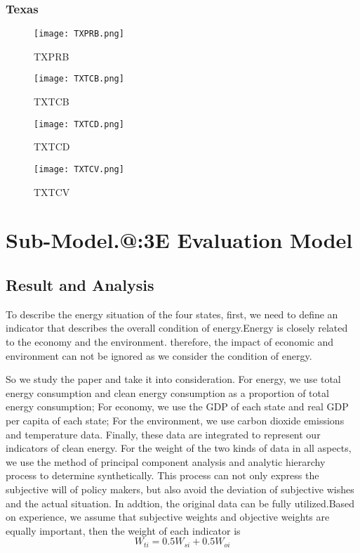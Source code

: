 \documentclass{mcmthesis}
\makeatletter
\newcommand{\Rmnum}[1]{\expandafter\@slowromancap\romannumeral #1@}
\makeatother
\begin{document}
\subsubsection{Texas}
\begin{figure}[H]
\begin{minipage}[htb]{0.5\textwidth}
\centering
\texttt{[image: TXPRB.png]}
\caption{TXPRB} \label{fig:TXPRB}
\end{minipage}
\begin{minipage}[htb]{0.5\textwidth}
\centering
\texttt{[image: TXTCB.png]}
\caption{TXTCB} \label{fig:TXTCB}
\end{minipage}
\end{figure}

\begin{figure}[H]
\begin{minipage}[htb]{0.5\textwidth}
\centering
\texttt{[image: TXTCD.png]}
\caption{TXTCD} \label{fig:TXTCD}
\end{minipage}
\begin{minipage}[htb]{0.5\textwidth}
\centering
\texttt{[image: TXTCV.png]}
\caption{TXTCV} \label{fig:TXTCV}
\end{minipage}
\end{figure}



\section{Sub-Model.\Rmnum{1}:3E Evaluation Model}
\subsection{Result and Analysis}
To describe the energy situation of the four states, first, we need to define an indicator that describes the overall condition of energy.Energy is closely related to the economy and the environment. therefore, the impact of economic and environment can not be ignored as we consider the condition of energy.

So we study the paper \cite{zhaotao2008energy} and take it into consideration. For energy, we use total energy consumption and clean energy consumption as a proportion of total energy consumption; For economy, we use the GDP of each state and real GDP per capita of each state; For the environment, we use carbon dioxide emissions and temperature data. Finally, these data are integrated to represent our indicators of clean energy.
For the weight of the two kinds of data in all aspects, we use the method of principal component analysis and analytic hierarchy process to determine synthetically. This process can not only express the subjective will of policy makers, but also avoid the deviation of subjective wishes and the actual situation. In addtion, the original data can be fully utilized.Based on experience, we assume that subjective weights and objective weights are equally important, then the weight of each  indicator is
\begin{equation}
  W_{ti} = 0.5 W_{si} + 0.5 W_{oi} 
\end{equation}
\end{document}
